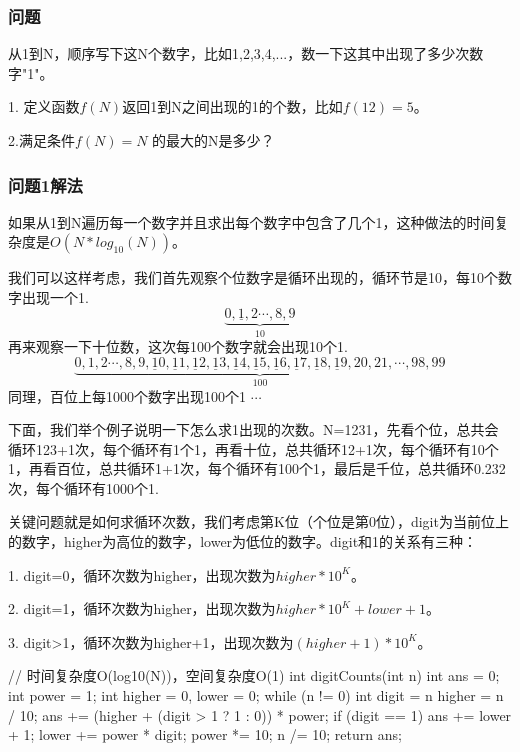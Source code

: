 \subsubsection{问题}
从1到N，顺序写下这N个数字，比如1,2,3,4,...，数一下这其中出现了多少次数字"1"。

1. 定义函数$f(N)$返回1到N之间出现的1的个数，比如$f(12)=5$。

2.满足条件$f(N) = N$ 的最大的N是多少？

\subsubsection{问题1解法}
如果从1到N遍历每一个数字并且求出每个数字中包含了几个1，这种做法的时间复杂度是$O(N*log_{10}(N))$。

我们可以这样考虑，我们首先观察个位数字是循环出现的，循环节是10，每10个数字出现一个1.
\[\underbrace {0, \underline{1}, 2 \cdots , 8, 9}_{10}\]
再来观察一下十位数，这次每100个数字就会出现10个1.
\[\underbrace {0, 1, 2 \cdots , 8, 9, \underline{1}0, \underline{1}1, \underline{1}2, \underline{1}3, \underline{1}4, \underline{1}5, \underline{1}6, \underline{1}7, \underline{1}8, \underline{1}9, 20, 21, \cdots , 98, 99}_{100}\]
同理，百位上每1000个数字出现100个1 $\cdots$

下面，我们举个例子说明一下怎么求1出现的次数。N=1231，先看个位，总共会循环123+1次，每个循环有1个1，再看十位，总共循环12+1次，每个循环有10个1，再看百位，总共循环1+1次，每个循环有100个1，最后是千位，总共循环0.232次，每个循环有1000个1.

关键问题就是如何求循环次数，我们考虑第K位（个位是第0位），digit为当前位上的数字，higher为高位的数字，lower为低位的数字。digit和1的关系有三种：

1. digit=0，循环次数为higher，出现次数为$higher*10^K$。

2. digit=1，循环次数为higher，出现次数为$higher*10^K+lower+1$。

3. digit>1，循环次数为higher+1，出现次数为$(higher+1)*10^K$。


\begin{Code}
// 时间复杂度O(log10(N))，空间复杂度O(1)
int digitCounts(int n) {
    int ans = 0;
    int power = 1;
    int higher = 0, lower = 0;
    while (n != 0) {
        int digit = n %
        higher = n / 10;
        ans += (higher + (digit > 1 ? 1 : 0)) * power;
        if (digit == 1) {
            ans += lower + 1;
        }
        lower += power * digit;
        power *= 10;
        n /= 10;
    }
    return ans;
}
\end{Code}


